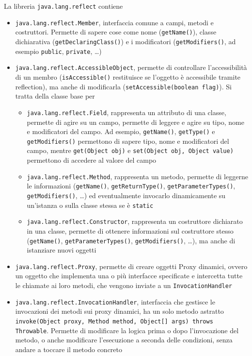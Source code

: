 La libreria \texttt{java.lang.reflect} contiene
\begin{itemize}
	\item \texttt{java.lang.reflect.Member}, interfaccia comune a campi, metodi e costruttori. Permette di sapere cose come nome (\texttt{getName()}), classe dichiarativa (\texttt{getDeclaringClass()}) e i modificatori (\texttt{getModifiers()}, ad esempio \texttt{public}, \texttt{private}, \dots)

	\item \texttt{java.lang.reflect.AccessibleObject}, permette di controllare l'accessibilità di un membro (\texttt{isAccessible()} restituisce se l'oggetto è accessibile tramite reflection), ma anche di modificarla (\texttt{setAccessible(boolean flag)}). Si tratta della classe base per
	\begin{itemize}
		\item \texttt{java.lang.reflect.Field}, rappresenta un attributo di una classe, permette di agire su un campo, permette di leggere e agire su tipo, nome e modificatori del campo. Ad esempio, \texttt{getName()}, \texttt{getType()} e \texttt{getModifiers()} permettono di sapere tipo, nome e modificatori del campo, mentre \texttt{get(Object obj)} e \texttt{set(Object obj, Object value)} permettono di accedere al valore del campo

		\item \texttt{java.lang.reflect.Method}, rappresenta un metodo, permette di leggerne le informazioni (\texttt{getName()}, \texttt{getReturnType()}, \texttt{getParameterTypes()}, \texttt{getModifiers()}, \dots) ed eventualmente invocarlo dinamicamente su un'istanza o sulla classe stessa se è \texttt{static}

		\item \texttt{java.lang.reflect.Constructor}, rappresenta un costruttore dichiarato in una classe, permette di ottenere informazioni sul costruttore stesso (\texttt{getName()}, \texttt{getParameterTypes()}, \texttt{getModifiers()}, \dots), ma anche di istanziare nuovi oggetti
	\end{itemize}

	\item \texttt{java.lang.reflect.Proxy}, permette di creare oggetti Proxy dinamici, ovvero un oggetto che implementa una o più interfacce specificate e intercetta tutte le chiamate ai loro metodi, che vengono inviate a un \texttt{InvocationHandler}

	\item \texttt{java.lang.reflect.InvocationHandler}, interfaccia che gestisce le invocazioni dei metodi sui proxy dinamici, ha un solo metodo astratto \texttt{invoke(Object proxy, Method method, Object[] args) throws Throwable}. Permette di modificare la logica prima o dopo l'invocazione del metodo, o anche modificare l'esecuzione a seconda delle condizioni, senza andare a toccare il metodo concreto
\end{itemize}

